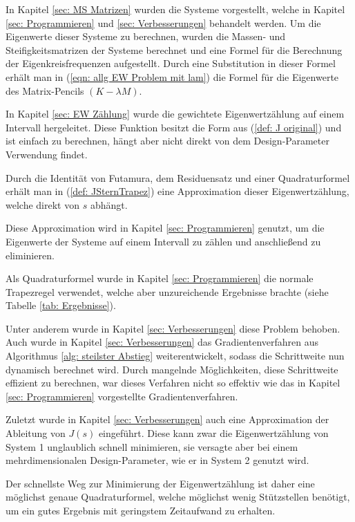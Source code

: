 \documentclass[a4paper,12pt]{report}
\newcommand{\1}{\mathds{1}}
\theoremstyle{plain} %
\theoremstyle{definition} %
\theoremstyle{remark}
\begin{document}
      In Kapitel \ref{sec: MS Matrizen} wurden die Systeme vorgestellt, welche in Kapitel \ref{sec: Programmieren} und \ref{sec: Verbesserungen} behandelt werden.
      Um die Eigenwerte dieser Systeme zu berechnen, wurden die Massen- und Steifigkeitsmatrizen der Systeme berechnet und eine Formel für die Berechnung der Eigenkreisfrequenzen aufgestellt.
      Durch eine Substitution in dieser Formel erhält man in (\ref{eqn: allg EW Problem mit lam}) die Formel für die Eigenwerte des Matrix-Pencils $(K-\lambda M)$.

      In Kapitel \ref{sec: EW Zählung} wurde die gewichtete Eigenwertzählung auf einem Intervall hergeleitet. Diese Funktion besitzt die Form aus (\ref{def: J original})
      und ist einfach zu berechnen, hängt aber nicht direkt von dem Design-Parameter Verwendung findet.

      Durch die Identität von Futamura, dem Residuensatz und einer Quadraturformel erhält man in (\ref{def: JSternTrapez}) eine Approximation dieser Eigenwertzählung,
      welche direkt von $s$ abhängt.

      Diese Approximation wird in Kapitel \ref{sec: Programmieren} genutzt, um die Eigenwerte der Systeme auf einem Intervall zu zählen und anschließend zu eliminieren.
      
      Als Quadraturformel wurde in Kapitel \ref{sec: Programmieren} die normale Trapezregel verwendet, welche aber unzureichende Ergebnisse brachte (siehe Tabelle \ref{tab: Ergebnisse}).

      Unter anderem wurde in Kapitel \ref{sec: Verbesserungen} diese Problem behoben.
      Auch wurde in Kapitel \ref{sec: Verbesserungen} das Gradientenverfahren aus Algorithmus \ref{alg: steilster Abstieg} weiterentwickelt, sodass die Schrittweite nun dynamisch berechnet wird.
      Durch mangelnde Möglichkeiten, diese Schrittweite effizient zu berechnen, war dieses Verfahren nicht so effektiv wie das in Kapitel \ref{sec: Programmieren} vorgestellte Gradientenverfahren.

      Zuletzt wurde in Kapitel \ref{sec: Verbesserungen} auch eine Approximation der Ableitung von $J(s)$ eingeführt.
      Diese kann zwar die Eigenwertzählung von System 1 unglaublich schnell minimieren, sie versagte aber bei einem mehrdimensionalen Design-Parameter, wie er in System 2 genutzt wird.

      Der schnellste Weg zur Minimierung der Eigenwertzählung ist daher eine möglichst genaue Quadraturformel,
      welche möglichst wenig Stützstellen benötigt, um ein gutes Ergebnis mit geringstem Zeitaufwand zu erhalten.
\end{document}

